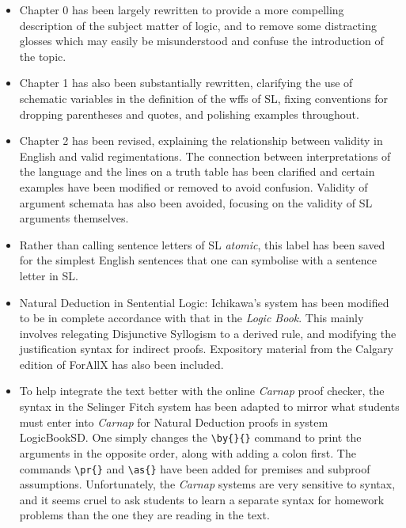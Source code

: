 \begin{itemize}

\item Chapter 0 has been largely rewritten to provide a more compelling description of the subject matter of logic, and to remove some distracting glosses which may easily be misunderstood and confuse the introduction of the topic.

\item Chapter 1 has also been substantially rewritten, clarifying the use of schematic variables in the definition of the wffs of SL, fixing conventions for dropping parentheses and quotes, and polishing examples throughout.

\item Chapter 2 has been revised, explaining the relationship between validity in English and valid regimentations. The connection between interpretations of the language and the lines on a truth table has been clarified and certain examples have been modified or removed to avoid confusion. Validity of argument schemata has also been avoided, focusing on the validity of SL arguments themselves.

\item Rather than calling sentence letters of SL \textit{atomic}, this label has been saved for the simplest English sentences that one can symbolise with a sentence letter in SL.

\item Natural Deduction in Sentential Logic: Ichikawa's system has been modified to be in complete accordance with that in the \textit{Logic Book}.
  This mainly involves relegating Disjunctive Syllogism to a derived rule, and modifying the justification syntax for indirect proofs.
  Expository material from the Calgary edition of ForAllX has also been included.

\item To help integrate the text better with the online \textit{Carnap} proof checker, the syntax in the Selinger Fitch system has been adapted to mirror what students must enter into \textit{Carnap} for Natural Deduction proofs in system LogicBookSD.
  One simply changes the \verb|\by{}{}| command to print the arguments in the opposite order, along with adding a colon first.
  The commands \verb|\pr{}| and \verb|\as{}| have been added for premises and subproof assumptions.
  Unfortunately, the \textit{Carnap} systems are very sensitive to syntax, and it seems cruel to ask students to learn a separate syntax for homework problems than the one they are reading in the text. %


\end{itemize}
